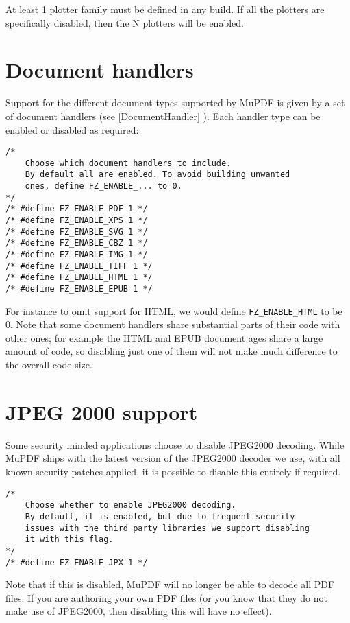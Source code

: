 \documentclass[oneside]{book}
\newcommand{\rjwref}[1] {\autoref{#1} \nameref{#1}}
\begin{document}
At least 1 plotter family must be defined in any build. If all the plotters are specifically disabled, then the N plotters will be enabled.

\section{Document handlers}

Support for the different document types supported by MuPDF is given by  a set of document handlers (see \rjwref{DocumentHandler}). Each handler type can be enabled or disabled as required:

\begin{lstlisting}
/*
	Choose which document handlers to include.
	By default all are enabled. To avoid building unwanted
	ones, define FZ_ENABLE_... to 0.
*/
/* #define FZ_ENABLE_PDF 1 */
/* #define FZ_ENABLE_XPS 1 */
/* #define FZ_ENABLE_SVG 1 */
/* #define FZ_ENABLE_CBZ 1 */
/* #define FZ_ENABLE_IMG 1 */
/* #define FZ_ENABLE_TIFF 1 */
/* #define FZ_ENABLE_HTML 1 */
/* #define FZ_ENABLE_EPUB 1 */
\end{lstlisting}

For instance to omit support for HTML, we would define \texttt{FZ\_ENABLE\_HTML} to be 0. Note that some document handlers share substantial parts of their code with other ones; for example the HTML and EPUB document ages share a large amount of code, so disabling just one of them will not make much difference to the overall code size.

\section{JPEG 2000 support}

Some security minded applications choose to disable JPEG2000 decoding. While MuPDF ships with the latest version of the JPEG2000 decoder we use, with all known security patches applied, it is possible to disable this entirely if required.

\begin{lstlisting}
/*
	Choose whether to enable JPEG2000 decoding.
	By default, it is enabled, but due to frequent security
	issues with the third party libraries we support disabling
	it with this flag.
*/
/* #define FZ_ENABLE_JPX 1 */
\end{lstlisting}

Note that if this is disabled, MuPDF will no longer be able to decode all PDF files. If you are authoring your own PDF files (or you know that they do not make use of JPEG2000, then disabling this will have no effect).
\end{document}
